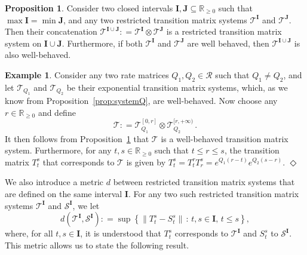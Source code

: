 \documentclass[10pt,a4paper]{paper}
\theoremstyle{definition}
\newtheorem{exmp}{Example}%
\newtheorem{proposition}[theorem]{Proposition}
\newcommand{\reals}{\mathbb{R}}
\newcommand{\realsnonneg}{\reals_{\geq 0}}
\newcommand{\norm}[1]{\left\lVert #1 \right\rVert}
\newcommand{\coloneqq}{:\!=}
\newcommand{\exampleend}{\hfill$\Diamond$}
\begin{document}
\begin{proposition}\label{prop:concat_restr_trans_mat_systems_is_system}
Consider two closed intervals $\mathbf{I},\mathbf{J}\subseteq\realsnonneg$ such that $\max\mathbf{I}=\min\mathbf{J}$, and any two restricted transition matrix systems $\mathcal{T}^{\mathbf{I}}$ and $\mathcal{T}^{\mathbf{J}}$. Then their concatenation $\mathcal{T}^{\mathbf{I}\cup \mathbf{J}} \coloneqq \mathcal{T}^{\mathbf{I}}\otimes \mathcal{T}^{\mathbf{J}}$ is a restricted transition matrix system on $\mathbf{I}\cup\mathbf{J}$. Furthermore, if both $\mathcal{T}^{\mathbf{I}}$ and $\mathcal{T}^{\mathbf{J}}$ are well behaved, then $\mathcal{T}^{\mathbf{I}\cup\mathbf{J}}$ is also well-behaved.
\end{proposition}

\begin{exmp}\label{exmp:combinetwoexponentials}
Consider any two rate matrices $Q_1,Q_2\in\mathcal{R}$ such that $Q_1\neq Q_2$, and let $\mathcal{T}_{Q_1}$ and $\mathcal{T}_{Q_2}$ be their exponential transition matrix systems, which, as we know from Proposition~\ref{prop:systemQ}, are well-behaved. Now choose any $r\in\realsnonneg$ and define
\begin{equation*}
\mathcal{T} \coloneqq \mathcal{T}_{Q_1}^{[0,r]} \otimes \mathcal{T}_{Q_2}^{[r,+\infty)}\,.
\end{equation*}
It then follows from Proposition~\ref{prop:concat_restr_trans_mat_systems_is_system} that $\mathcal{T}$ is a well-behaved transition matrix system. Furthermore, for any $t,s\in\realsnonneg$ such that $t\leq r\leq s$, the transition matrix $T_t^s$ that corresponds to $\mathcal{T}$ is given by $T_t^s = T_t^rT_r^s = e^{Q_1(r-t)}e^{Q_2(s-r)}$.
\exampleend
\end{exmp}

We also introduce a metric $d$ between restricted transition matrix systems that are defined on the same interval $\mathbf{I}$. For any two such restricted transition matrix systems $\mathcal{T}^\mathbf{I}$ and $\mathcal{S}^\mathbf{I}$, we let
\begin{equation}\label{eq:trans_mat_system_metric}
d(\mathcal{T}^{\mathbf{I}},\mathcal{S}^{\mathbf{I}}) \coloneqq \sup\left\{\norm{T_t^s - S_t^s}\,:\,t,s\in\mathbf{I},\,t\leq s\right\},
\end{equation}
where, for all $t,s\in\mathbf{I}$, it is understood that $T_t^s$ corresponds to $\mathcal{T}^{\mathbf{I}}$ and $S_t^s$ to $\mathcal{S}^{\mathbf{I}}$. This metric allows us to state the following result.
\end{document}
